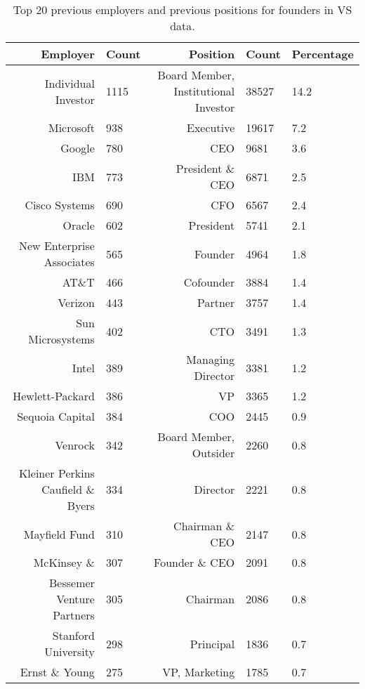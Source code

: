 \begin{table}[!htb]
\centering
\begingroup\footnotesize
\begin{tabular}{rlrll}
  \toprule
Employer & Count & Position & Count & Percentage \\ 
  \midrule
Individual Investor & 1115 & Board Member, Institutional Investor & 38527 & 14.2 \\ 
  Microsoft & 938 & Executive & 19617 & 7.2 \\ 
  Google & 780 & CEO & 9681 & 3.6 \\ 
  IBM & 773 & President \& CEO & 6871 & 2.5 \\ 
  Cisco Systems & 690 & CFO & 6567 & 2.4 \\ 
  Oracle & 602 & President & 5741 & 2.1 \\ 
  New Enterprise Associates & 565 & Founder & 4964 & 1.8 \\ 
  AT\&T & 466 & Cofounder & 3884 & 1.4 \\ 
  Verizon & 443 & Partner & 3757 & 1.4 \\ 
  Sun Microsystems & 402 & CTO & 3491 & 1.3 \\ 
  Intel & 389 & Managing Director & 3381 & 1.2 \\ 
  Hewlett-Packard & 386 & VP & 3365 & 1.2 \\ 
  Sequoia Capital & 384 & COO & 2445 & 0.9 \\ 
  Venrock & 342 & Board Member, Outsider & 2260 & 0.8 \\ 
  Kleiner Perkins Caufield \& Byers & 334 & Director & 2221 & 0.8 \\ 
  Mayfield Fund & 310 & Chairman \& CEO & 2147 & 0.8 \\ 
  McKinsey \& & 307 & Founder \& CEO & 2091 & 0.8 \\ 
  Bessemer Venture Partners & 305 & Chairman & 2086 & 0.8 \\ 
  Stanford University & 298 & Principal & 1836 & 0.7 \\ 
  Ernst \& Young & 275 & VP, Marketing & 1785 & 0.7 \\ 
   \bottomrule
\end{tabular}
\endgroup
\caption{Top 20 previous employers and previous positions for founders in VS data.} 
\label{table:VS_previousEmployersSummaryTable}
\end{table}
